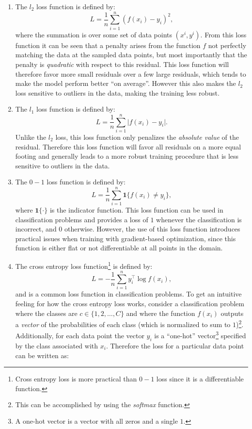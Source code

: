 \begin{enumerate}
\item The $l_2$ loss function is defined by:
\begin{equation} \label{eq:l2loss}
L = \frac{1}{n}\sum_{i=1}^n ( f(x_i) - y_i )^2,
\end{equation}
where the summation is over some set of data points $(x^i, y^i)$. From this loss function it can be seen that a penalty arises from the function $f$ not perfectly matching the data at the sampled data points, but most importantly that the penalty is \textit{quadratic} with respect to this residual. This loss function will therefore favor more small residuals over a few large residuals, which tends to make the model perform better ``on average''. However this also makes the $l_2$ loss sensitive to outliers in the data, making the training less robust.
\item The $l_1$ loss function is defined by:
\begin{equation}
L = \frac{1}{n}\sum_{i=1}^n \lvert f(x_i) - y_i \rvert.
\end{equation}
Unlike the $l_2$ loss, this loss function only penalizes the \textit{absolute value} of the residual. Therefore this loss function will favor all residuals on a more equal footing and generally leads to a more robust training procedure that is less sensitive to outliers in the data.
\item The $0-1$ loss function is defined by:
\begin{equation}
L = \frac{1}{n}\sum_{i=1}^n \mathbf{1}\{f(x_i) \neq y_i \},
\end{equation}
where $\mathbf{1}\{\cdot\}$ is the indicator function.
This loss function can be used in classification problems and provides a loss of $1$ whenever the classification is incorrect, and $0$ otherwise. However, the use of this loss function introduces practical issues when training with gradient-based optimization, since this function is either flat or not differentiable at all points in the domain.
\item The cross entropy loss function\footnote{Cross entropy loss is more practical than $0-1$ loss since it is a differentiable function.} is defined by:
\begin{equation}
L = -\frac{1}{n}\sum_{i=1}^n y^\top_i \log f(x_i),
\end{equation}
and is a common loss function in classification problems. To get an intuitive feeling for how the cross entropy loss works, consider a classification problem where the classes are $c \in \{1, 2, \dots, C\}$ and where the function $f(x_i)$ outputs a \textit{vector} of the probabilities of each class (which is normalized to sum to $1$)\footnote{This can be accomplished by using the \textit{softmax} function.}. Additionally, for each data point the vector $y_i$ is a ``one-hot'' vector\footnote{A one-hot vector is a vector with all zeros and a single $1$.} specified by the class associated with $x_i$. Therefore the loss for a particular data point can be written as:

\end{enumerate}
